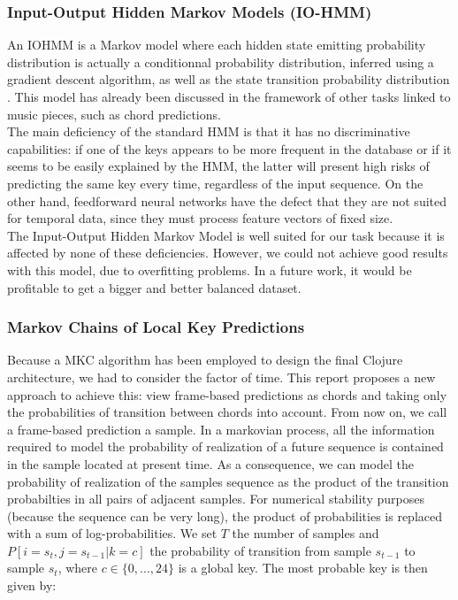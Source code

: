 \documentclass[letterpaper]{article}
\begin{document}
\subsubsection{Input-Output Hidden Markov Models (IO-HMM)}
\label{sssec:iohmm}

An IOHMM is a Markov model where each hidden state emitting probability distribution is actually a conditionnal probability distribution, inferred using a gradient descent algorithm, as well as the state transition probability distribution \citep{YB}. This model has already been discussed in the framework of other tasks linked to  music pieces, such as chord predictions. \\

The main deficiency of the standard HMM is that it has no discriminative capabilities: if one of the keys appears to be more frequent in the database or
if it seems to be easily explained by the HMM, the latter will present high risks of predicting the same key every time, regardless of the
input sequence. On the other hand, feedforward neural networks have the defect that they are not suited for temporal data, since they must 
process feature vectors of fixed size. \\

The Input-Output Hidden Markov Model is well suited for our task because it is affected by none of these deficiencies.
However, we could not achieve good results with this model, due to overfitting problems. In a future work, it would be profitable to get a bigger and better balanced dataset.

\subsubsection{Markov Chains of Local Key Predictions}

Because a MKC algorithm has been employed to design the final Clojure architecture, we had to consider the factor of time. This report proposes a new approach to achieve this: view frame-based predictions as chords and taking only the probabilities of transition between chords into account. From now on, we call a frame-based prediction a sample. In a markovian process, all the information required to model the probability of realization of a future sequence is contained in the sample located at present time. As a consequence, we can model the probability of realization of the samples sequence as the product of the transition probabilties in all pairs of adjacent samples. For numerical stability purposes (because the sequence can be very long), the product of probabilities is replaced with a sum of log-probabilities. We set $T$ the number of samples and $P[i=s_t, j=s_{t-1} | k = c]$ the probability of transition from sample $s_{t-1}$ to sample $s_{t}$, where $c \in \{0, ..., 24\}$ is a global key. The most probable key is then given by:
\end{document}
